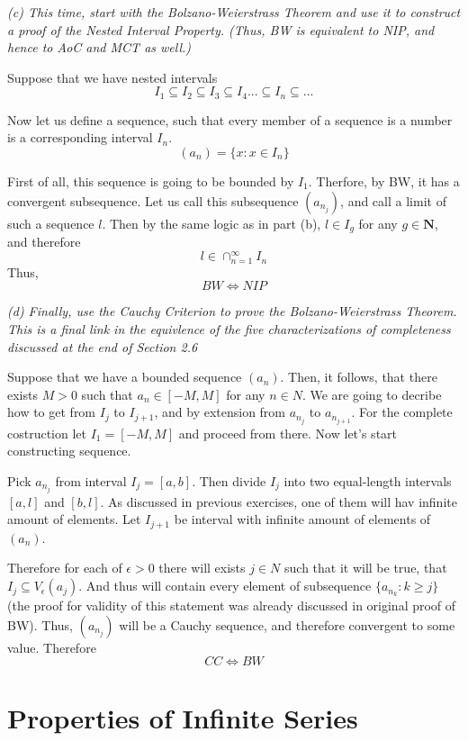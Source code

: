 \documentclass[11pt,oneside,titlepage]{book}
\begin{document}
\textit{(c) This time, start with the Bolzano-Weierstrass Theorem and
  use it to construct a proof of the Nested Interval Property. (Thus, BW
  is equivalent to NIP, and hence to AoC and MCT as well.)}

Suppose that we have nested intervals
$$I_1 \subseteq I_2 \subseteq I_3 \subseteq I_4 ... \subseteq I_n \subseteq ...$$

Now let us define a sequence, such that every member of a sequence is
a number is a corresponding interval $I_n$.
$$(a_n) = \{x: x \in I_n\}$$

First of all, this sequence is going to be bounded by $I_1$. Therfore, by
BW, it has a convergent subsequence. Let us call this subsequence $(a_{n_j})$,
and call a limit of such a sequence $l$. Then by the same logic as in part (b),
$l \in I_g$ for any $g \in \textbf{N}$, and therefore
$$l \in \cap_{n = 1}^{\infty}I_n$$
Thus,
$$BW \iff NIP$$

\textit{(d) Finally, use the Cauchy Criterion to prove the Bolzano-Weierstrass
  Theorem. This is a final link in the equivlence of the five characterizations
  of completeness discussed at the end of Section 2.6}

Suppose that we have a bounded sequence $(a_n)$. Then, it follows, that
there exists $M > 0$ such that $a_n \in [-M, M]$ for any $n \in N$.
We are going to decribe how to get from $I_j$ to $I_{j + 1}$, and
by extension from $a_{n_j}$ to $a_{n_{j + 1}}$. For the complete costruction
let $I_1 = [-M, M]$ and proceed from there.
Now let's start constructing sequence.

Pick $a_{n_{j}} $ from interval $I_j = [a, b]$. Then divide $I_j$ into two
equal-length intervals $[a, l]$ and $[b, l]$. As discussed in previous
exercises, one of them will hav infinite amount of elements. Let $I_{j + 1}$
be interval with infinite amount of elements of $(a_n)$.

Therefore for each of $\epsilon > 0$ there will exists $j \in N$ such that
it will be true, that $I_j \subseteq V_\epsilon(a_j)$. And thus will contain
every  element of subsequence $\{a_{n_k}: k \geq j\}$ (the proof for validity
of this statement was already discussed in original proof of BW). Thus,
$(a_{n_j})$ will be a Cauchy sequence, and therefore convergent to some
value. Therefore
$$CC \iff BW$$

\section{Properties of Infinite Series}
\end{document}
